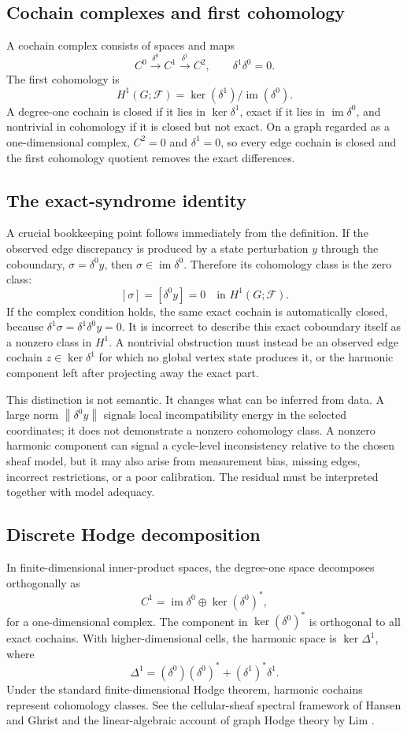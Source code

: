 \documentclass[12pt,a4paper]{article}
\DeclareMathOperator{\im}{im}
\newcommand{\norm}[1]{\left\lVert #1 \right\rVert}
\newcommand{\F}{\mathcal{F}}
\begin{document}
\subsection{Cochain complexes and first cohomology}
A cochain complex consists of spaces and maps
\[
C^0\xrightarrow{\delta^0}C^1\xrightarrow{\delta^1}C^2,
\qquad \delta^1\delta^0=0.
\tag{4}\label{eq:cochain}
\]
The first cohomology is
\[
H^1(G;\F)=\ker(\delta^1)/\im(\delta^0).
\tag{5}\label{eq:h1}
\]
A degree-one cochain is closed if it lies in \(\ker\delta^1\), exact if it lies in \(\im\delta^0\), and nontrivial in cohomology if it is closed but not exact. On a graph regarded as a one-dimensional complex, \(C^2=0\) and \(\delta^1=0\), so every edge cochain is closed and the first cohomology quotient removes the exact differences.

\subsection{The exact-syndrome identity}
A crucial bookkeeping point follows immediately from the definition. If the observed edge discrepancy is produced by a state perturbation \(y\) through the coboundary, \(\sigma=\delta^0y\), then \(\sigma\in\im\delta^0\). Therefore its cohomology class is the zero class:
\[
[\sigma]=[\delta^0y]=0\quad\text{in }H^1(G;\F).
\tag{6}\label{eq:exactclass}
\]
If the complex condition holds, the same exact cochain is automatically closed, because \(\delta^1\sigma=\delta^1\delta^0y=0\). It is incorrect to describe this exact coboundary itself as a nonzero class in \(H^1\). A nontrivial obstruction must instead be an observed edge cochain \(z\in\ker\delta^1\) for which no global vertex state produces it, or the harmonic component left after projecting away the exact part.

This distinction is not semantic. It changes what can be inferred from data. A large norm \(\norm{\delta^0y}\) signals local incompatibility energy in the selected coordinates; it does not demonstrate a nonzero cohomology class. A nonzero harmonic component can signal a cycle-level inconsistency relative to the chosen sheaf model, but it may also arise from measurement bias, missing edges, incorrect restrictions, or a poor calibration. The residual must be interpreted together with model adequacy.

\subsection{Discrete Hodge decomposition}
In finite-dimensional inner-product spaces, the degree-one space decomposes orthogonally as
\[
C^1=\im\delta^0\oplus\ker(\delta^0)^*,
\tag{7}\label{eq:hodgegraph}
\]
for a one-dimensional complex. The component in \(\ker(\delta^0)^*\) is orthogonal to all exact cochains. With higher-dimensional cells, the harmonic space is \(\ker\Delta^1\), where
\[
\Delta^1=(\delta^0)(\delta^0)^*+(\delta^1)^*\delta^1.
\tag{8}\label{eq:hodge1}
\]
Under the standard finite-dimensional Hodge theorem, harmonic cochains represent cohomology classes. See the cellular-sheaf spectral framework of Hansen and Ghrist and the linear-algebraic account of graph Hodge theory by Lim \citep{HansenGhrist2019,Lim2020}.
\end{document}

